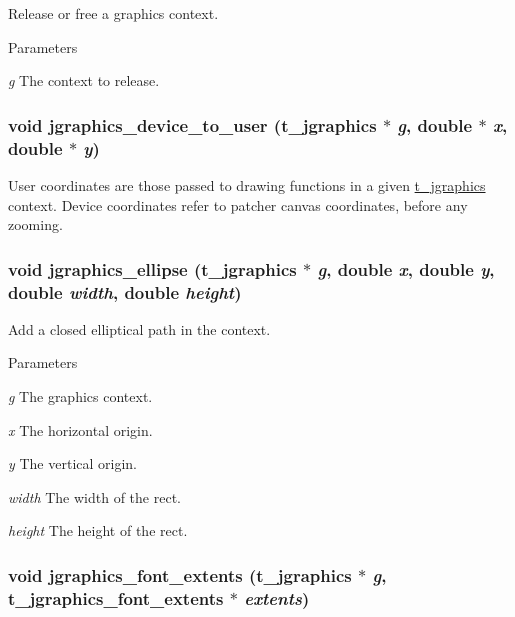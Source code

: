 Release or free a graphics context. 
\begin{DoxyParams}{Parameters}
\item[{\em g}]The context to release. \end{DoxyParams}
\hypertarget{group__jgraphics_ga8a6b2b8982f78d417cb5a15a3fbdb2e2}{
\subsubsection[{jgraphics\_\-device\_\-to\_\-user}]{\setlength{\rightskip}{0pt plus 5cm}void jgraphics\_\-device\_\-to\_\-user ({\bf t\_\-jgraphics} $\ast$ {\em g}, \/  double $\ast$ {\em x}, \/  double $\ast$ {\em y})}}
\label{group__jgraphics_ga8a6b2b8982f78d417cb5a15a3fbdb2e2}


User coordinates are those passed to drawing functions in a given \hyperlink{group__jgraphics_ga4bf27bd7e21a59a427481b909d4656e7}{t\_\-jgraphics} context. Device coordinates refer to patcher canvas coordinates, before any zooming. \hypertarget{group__jgraphics_ga1703b907a1167055ecea6674e00233d4}{
\subsubsection[{jgraphics\_\-ellipse}]{\setlength{\rightskip}{0pt plus 5cm}void jgraphics\_\-ellipse ({\bf t\_\-jgraphics} $\ast$ {\em g}, \/  double {\em x}, \/  double {\em y}, \/  double {\em width}, \/  double {\em height})}}
\label{group__jgraphics_ga1703b907a1167055ecea6674e00233d4}


Add a closed elliptical path in the context. 
\begin{DoxyParams}{Parameters}
\item[{\em g}]The graphics context. \item[{\em x}]The horizontal origin. \item[{\em y}]The vertical origin. \item[{\em width}]The width of the rect. \item[{\em height}]The height of the rect. \end{DoxyParams}
\hypertarget{group__jgraphics_ga4f556e322638d6427c2ecc7932d806ed}{
\subsubsection[{jgraphics\_\-font\_\-extents}]{\setlength{\rightskip}{0pt plus 5cm}void jgraphics\_\-font\_\-extents ({\bf t\_\-jgraphics} $\ast$ {\em g}, \/  {\bf t\_\-jgraphics\_\-font\_\-extents} $\ast$ {\em extents})}}
\label{group__jgraphics_ga4f556e322638d6427c2ecc7932d806ed}


